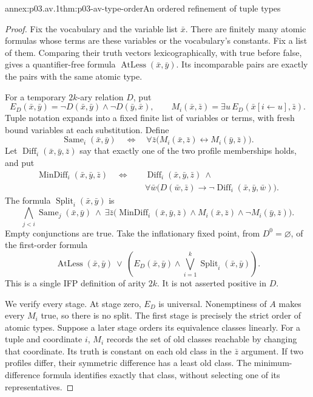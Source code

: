 \begin{annexitem}{annex:p03.av.1}{thm:p03-av-type-order}{An ordered refinement of tuple types}
\begin{proof}
Fix the vocabulary and the variable list \(\bar x\). There are
finitely many atomic formulas whose terms are these variables or the
vocabulary's constants. Fix a list of them. Comparing their truth
vectors lexicographically, with true before false, gives a quantifier-free
formula \(\operatorname{AtLess}(\bar x,\bar y)\). Its incomparable
pairs are exactly the pairs with the same atomic type.

For a temporary \(2k\)-ary relation \(D\), put
\[
 E_D(\bar x,\bar y)=
       \neg D(\bar x,\bar y)\land\neg D(\bar y,\bar x),
 \qquad
 M_i(\bar x,\bar z)=
       \exists u\,E_D(\bar x[i\leftarrow u],\bar z).
\]
Tuple notation expands into a fixed finite list of variables or
terms, with fresh bound variables at each substitution. Define
\[
 \operatorname{Same}_i(\bar x,\bar y)
 \quad\Longleftrightarrow\quad
 \forall\bar z\bigl(M_i(\bar x,\bar z)\leftrightarrow
                         M_i(\bar y,\bar z)\bigr).
\]
Let \(\operatorname{Diff}_i(\bar x,\bar y,\bar z)\) say that
exactly one of the two profile memberships holds, and put
\[
\begin{split}
 \operatorname{MinDiff}_i(\bar x,\bar y,\bar z)
 \quad\Longleftrightarrow\quad&
 \operatorname{Diff}_i(\bar x,\bar y,\bar z)\ \land\\
 &\forall\bar w\bigl(D(\bar w,\bar z)\to
             \neg\operatorname{Diff}_i(\bar x,\bar y,\bar w)\bigr).
\end{split}
\]
The formula \(\operatorname{Split}_i(\bar x,\bar y)\) is
\[
 \bigwedge_{j<i}\operatorname{Same}_j(\bar x,\bar y)
 \ \land\
 \exists\bar z\bigl(
   \operatorname{MinDiff}_i(\bar x,\bar y,\bar z)
   \land M_i(\bar x,\bar z)\land\neg M_i(\bar y,\bar z)\bigr).
\]
Empty conjunctions are true. Take the inflationary fixed point, from
\(D^0=\varnothing\), of the first-order formula
\[
 \operatorname{AtLess}(\bar x,\bar y)
 \ \lor\
 \left(E_D(\bar x,\bar y)\land
                 \bigvee_{i=1}^k\operatorname{Split}_i(\bar x,\bar y)\right).
 \tag{O}
\]
This is a single IFP definition of arity \(2k\). It is not
asserted positive in \(D\).

We verify every stage. At stage zero, \(E_D\) is universal.
Nonemptiness of \(A\) makes every \(M_i\) true, so there is
no split. The first stage is precisely the strict order of atomic
types. Suppose a later stage orders its equivalence classes linearly.
For a tuple and coordinate \(i\), \(M_i\) records the set of
old classes reachable by changing that coordinate. Its truth is
constant on each old class in the \(\bar z\) argument. If two
profiles differ, their symmetric difference has a least old class.
The minimum-difference formula identifies exactly that class, without
selecting one of its representatives.


\end{proof}
\end{annexitem}
